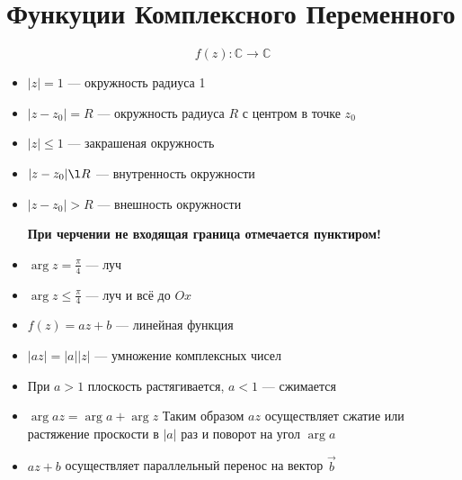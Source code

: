 \documentclass[oneside,final,14pt]{extreport}
\begin{document}
\section*{Функуции Комплексного Переменного}
\[f (z) \colon \mathbb{C} \to \mathbb{C} \]
\begin{itemize}
	\item $|z| = 1$ --- окружность радиуса 1
	\item $|z - z_0| = R$ --- окружность радиуса $R$ с центром в точке $z_0$
	\item $|z| \le 1$ --- закрашеная окружность
	\item $|z - z_0| \l R$  --- внутренность окружности
	\item $|z - z_0| > R$ --- внешность окружности 
	
	\textbf{При черчении не входящая граница отмечается пунктиром!}
	
	\item $\operatorname{arg} z = \frac \pi 4$ --- луч
	\item $\operatorname{arg} z \le \frac \pi 4$ --- луч и всё до $Ox$
	\item $f(z) = a z + b$ --- линейная функция
	\item $|a z| = |a| |z|$ --- умножение комплексных чисел
	\item При $a > 1$ плоскость растягивается, $a < 1$ --- сжимается
	\item $\operatorname{arg} a z = \operatorname{arg} a + \operatorname{arg} z$
	Таким образом $a z$ осуществляет сжатие или растяжение проскости в $|a|$ раз и поворот на угол $\operatorname{arg} a$
	\item $a z + b$ осуществляет параллельный перенос на вектор $\overrightarrow{b}$
\end{itemize}

	
\end{document}
